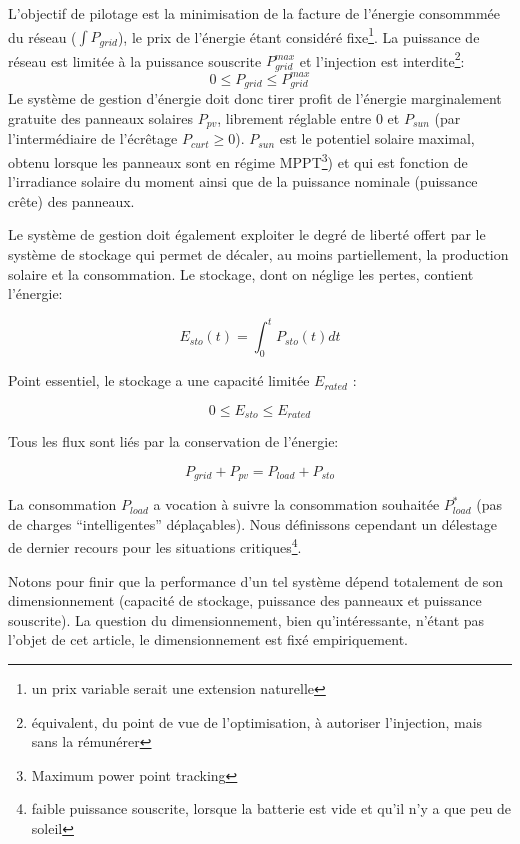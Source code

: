 \documentclass[a4paper,10pt,twocolumn]{article}
\begin{document}
L'objectif de pilotage est la minimisation de la facture
de l'énergie consommmée du réseau ($\int P_{grid}$), le prix de l'énergie étant considéré fixe\footnote{un prix variable serait une extension naturelle}.
La puissance de réseau est limitée à la puissance souscrite $P_{grid}^{max}$
et l'injection est interdite\footnote{
équivalent, du point de vue de l'optimisation, à autoriser l'injection, mais sans la rémunérer}:
%
\begin{equation}
  0 \leq P_{grid} \leq P_{grid}^{max}
\end{equation}
%
Le système de gestion d'énergie doit donc tirer profit de l'énergie marginalement
gratuite des panneaux solaires $P_{pv}$, librement réglable entre 0 et $P_{sun}$
(par l'intermédiaire de l'écrêtage $P_{curt} \geq 0$).
$P_{sun}$ est le potentiel solaire maximal, obtenu lorsque les panneaux sont en régime
MPPT\footnote{Maximum power point tracking}) et qui est fonction de l'irradiance solaire du moment
ainsi que de la puissance nominale (puissance crête) des panneaux.

Le système de gestion doit également exploiter le degré de liberté offert par
le système de stockage qui permet de décaler, au moins partiellement,
la production solaire et la consommation. Le stockage, dont on néglige les pertes,
contient l'énergie:

\begin{equation}
  E_{sto}(t) = \int_0^t P_{sto}(t)dt
\end{equation}

Point essentiel, le stockage a une capacité limitée $E_{rated}$ :

\begin{equation}
  0 \leq E_{sto} \leq E_{rated}
\end{equation}

Tous les flux sont liés par la conservation de l'énergie:

\begin{equation}
  P_{grid} + P_{pv} = P_{load} + P_{sto}
\end{equation}

La consommation $P_{load}$ a vocation à suivre la consommation souhaitée $P_{load}^*$
(pas de charges ``intelligentes'' déplaçables). Nous définissons cependant un délestage de dernier
recours pour les situations critiques\footnote{faible puissance souscrite, lorsque
la batterie est vide et qu'il n'y a que peu de soleil}.

Notons pour finir que la performance d'un tel système dépend totalement de son dimensionnement
(capacité de stockage, puissance des panneaux et  puissance souscrite).
La question du dimensionnement, bien qu'intéressante, n'étant pas l'objet de cet article,
le dimensionnement est fixé empiriquement.
\end{document}
